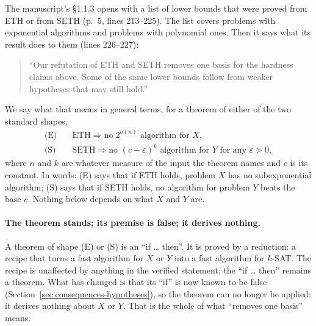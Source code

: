 The manuscript's \S1.1.3 opens with a list of lower bounds that were
proved from ETH or from SETH (p.~5, lines 213--225). The list covers problems with
exponential algorithms and problems with polynomial ones. Then it
says what its result does to them (lines 226--227):
\begin{quote}\small
``Our refutation of ETH and SETH removes one basis for the hardness
claims above. Some of the same lower bounds follow from weaker
hypotheses that may still hold.''
\end{quote}
We say what that means in general terms, for a theorem of either of the
two standard shapes,
\begin{align*}
  \text{(E)}&\quad \text{ETH} \Rightarrow \text{no } 2^{o(n)} \text{ algorithm for } X,\\
  \text{(S)}&\quad \text{SETH} \Rightarrow \text{no } (c - \varepsilon)^{k} \text{ algorithm for } Y \text{ for any } \varepsilon > 0,
\end{align*}
where $n$ and $k$ are whatever measure of the input the theorem names
and $c$ is its constant. In words: (E) says that if ETH holds, problem
$X$ has no subexponential algorithm; (S) says that if SETH holds, no
algorithm for problem $Y$ beats the base $c$. Nothing below depends on
what $X$ and $Y$ are.

\paragraph{The theorem stands; its premise is false; it derives nothing.}
A theorem of shape (E) or (S) is an ``if \ldots{} then''. It is proved
by a reduction: a recipe that turns a fast algorithm for $X$ or $Y$ into
a fast algorithm for $k$-SAT. The recipe is unaffected by anything in
the verified statement; the ``if \ldots{} then'' remains a theorem. What
has changed is that its ``if'' is now known to be false
(Section~\ref{sec:consequences-hypotheses}), so the theorem can no
longer be applied: it derives nothing about $X$ or $Y$. That is the
whole of what ``removes one basis'' means.

